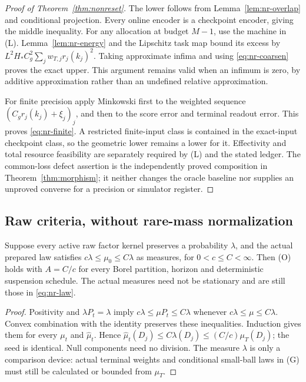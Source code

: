 \begin{proof}[Proof of Theorem~\ref{thm:nonreset}]
The lower follows from Lemma~\ref{lem:nr-overlap} and conditional projection. Every online encoder is a checkpoint encoder, giving the middle inequality. For any allocation at budget $M-1$, use the machine in \textup{(L)}. Lemma~\ref{lem:nr-energy} and the Lipschitz task map bound its excess by $L^2H_*C_g^2\sum_jw_{T,j}r_j(k_j)^2$. Taking approximate infima and using \eqref{eq:nr-coarsen} proves the exact upper. This argument remains valid when an infimum is zero, by additive approximation rather than an undefined relative approximation.

For finite precision apply Minkowski first to the weighted sequence $(C_gr_j(k_j)+\xi_j)_j$, and then to the score error and terminal readout error. This proves \eqref{eq:nr-finite}. A restricted finite-input class is contained in the exact-input checkpoint class, so the geometric lower remains a lower for it. Effectivity and total resource feasibility are separately required by \textup{(L)} and the stated ledger. The common-loss defect assertion is the independently proved composition in Theorem~\ref{thm:morphism}; it neither changes the oracle baseline nor supplies an unproved converse for a precision or simulator register.
\end{proof}

\subsection{Raw criteria, without rare-mass normalization}
\begin{proposition}\label{prop:nr-reference}
Suppose every active raw factor kernel preserves a probability $\lambda$, and the actual prepared law satisfies $c\lambda\le\mu_0\le C\lambda$ as measures, for $0<c\le C<\infty$. Then \textup{(O)} holds with $A=C/c$ for every Borel partition, horizon and deterministic suspension schedule. The actual measures need not be stationary and are still those in \eqref{eq:nr-law}.
\end{proposition}
\begin{proof}
Positivity and $\lambda P_t=\lambda$ imply $c\lambda\le\mu P_t\le C\lambda$ whenever $c\lambda\le\mu\le C\lambda$. Convex combination with the identity preserves these inequalities. Induction gives them for every $\mu_t$ and $\widehat\mu_t$. Hence $\widehat\mu_t(D_j)\le C\lambda(D_j)\le(C/c)\mu_T(D_j)$; the seed is identical. Null components need no division. The measure $\lambda$ is only a comparison device: actual terminal weights and conditional small-ball laws in \textup{(G)} must still be calculated or bounded from $\mu_T$.
\end{proof}

